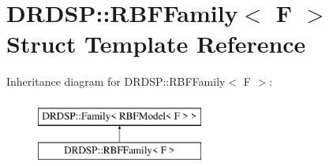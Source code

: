 \hypertarget{struct_d_r_d_s_p_1_1_r_b_f_family}{\section{D\-R\-D\-S\-P\-:\-:R\-B\-F\-Family$<$ F $>$ Struct Template Reference}
\label{struct_d_r_d_s_p_1_1_r_b_f_family}
}
Inheritance diagram for D\-R\-D\-S\-P\-:\-:R\-B\-F\-Family$<$ F $>$\-:\begin{figure}[H]
\begin{center}
\leavevmode
\includegraphics[height=2.000000cm]{struct_d_r_d_s_p_1_1_r_b_f_family}
\end{center}
\end{figure}
